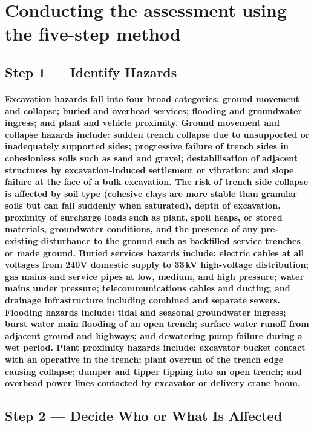 \section{Conducting the assessment using the five-step method}

\subsection{Step 1 --- Identify Hazards}
\paragraph{Excavation hazards fall into four broad categories: ground movement and collapse; buried and overhead services; flooding and groundwater ingress; and plant and vehicle proximity. Ground movement and collapse hazards include: sudden trench collapse due to unsupported or inadequately supported sides; progressive failure of trench sides in cohesionless soils such as sand and gravel; destabilisation of adjacent structures by excavation-induced settlement or vibration; and slope failure at the face of a bulk excavation. The risk of trench side collapse is affected by soil type (cohesive clays are more stable than granular soils but can fail suddenly when saturated), depth of excavation, proximity of surcharge loads such as plant, spoil heaps, or stored materials, groundwater conditions, and the presence of any pre-existing disturbance to the ground such as backfilled service trenches or made ground. Buried services hazards include: electric cables at all voltages from 240V domestic supply to 33\,kV high-voltage distribution; gas mains and service pipes at low, medium, and high pressure; water mains under pressure; telecommunications cables and ducting; and drainage infrastructure including combined and separate sewers. Flooding hazards include: tidal and seasonal groundwater ingress; burst water main flooding of an open trench; surface water runoff from adjacent ground and highways; and dewatering pump failure during a wet period. Plant proximity hazards include: excavator bucket contact with an operative in the trench; plant overrun of the trench edge causing collapse; dumper and tipper tipping into an open trench; and overhead power lines contacted by excavator or delivery crane boom.}

\subsection{Step 2 --- Decide Who or What Is Affected}
